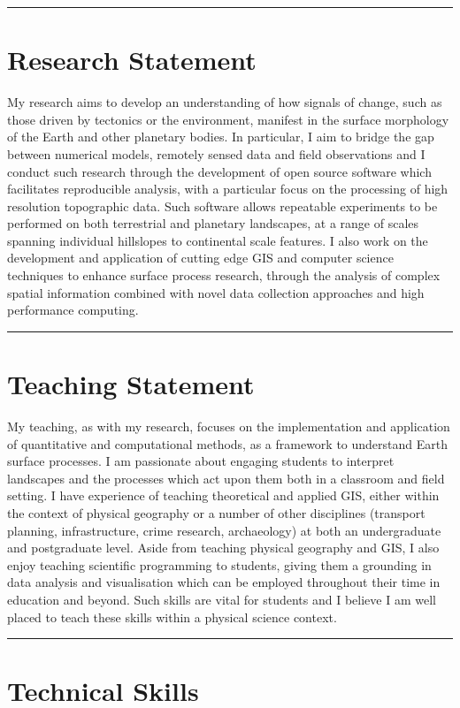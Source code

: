 \documentclass[10pt, a4paper]{article}
\begin{document}
  \hrule
  \section*{Research Statement}
  \noindent

  My research aims to develop an understanding of how signals of change, such as those driven by tectonics or the environment, manifest in the surface morphology of the Earth and other planetary bodies. In particular, I aim to bridge the gap between numerical models, remotely sensed data and field observations and I conduct such research through the development of open source software which facilitates reproducible analysis, with a particular focus on the processing of high resolution topographic data. Such software allows repeatable experiments to be performed on both terrestrial and planetary landscapes, at a range of scales spanning individual hillslopes to continental scale features. I also work on the development and application of cutting edge GIS and computer science techniques to enhance surface process research, through the analysis of complex spatial information combined with novel data collection approaches and high performance computing.\\[0.05cm]

  \hrule
  \section*{Teaching Statement}
  \noindent

  My teaching, as with my research, focuses on the implementation and application of quantitative and computational methods, as a framework to understand Earth surface processes. I am passionate about engaging students to interpret landscapes and the processes which act upon them both in a classroom and field setting. I have experience of teaching theoretical and applied GIS, either within the context of physical geography or a number of other disciplines (transport planning, infrastructure, crime research, archaeology) at both an undergraduate and postgraduate level. Aside from teaching physical geography and GIS, I also enjoy teaching scientific programming to students, giving them a grounding in data analysis and visualisation which can be employed throughout their time in education and beyond. Such skills are vital for students and I believe I am well placed to teach these skills within a physical science context.\\[0.05cm]

  \hrule
  \section*{Technical Skills}
  \noindent
\end{document}
